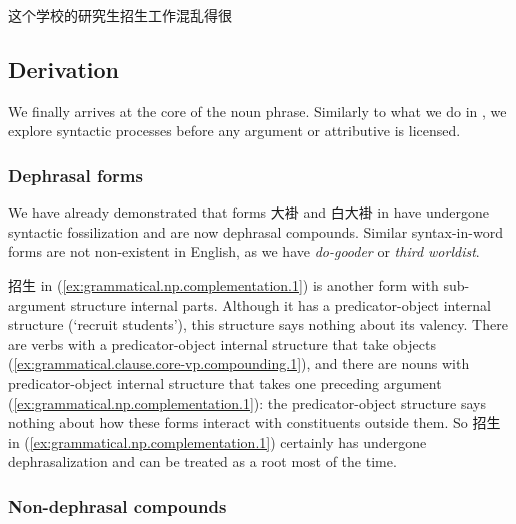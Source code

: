 \documentclass[UTF8, a4paper, oneside, scheme=plain, 12pt]{ctexrep}
\newcommand{\form}[1]{\emph{#1}}
\newcommand{\translate}[1]{`#1'}
\begin{document}
\begin{exe}
    \ex\label{ex:grammatical.np.complementation.4} 这个学校的研究生招生工作混乱得很
\end{exe}

\subsection{Derivation}\label{sec:grammatical.np.derivation}

We finally arrives at the core of the noun phrase.
Similarly to what we do in ,
we explore syntactic processes before any argument or attributive is licensed.

\subsubsection{Dephrasal forms}

We have already demonstrated that forms 大褂 and 白大褂 in 
have undergone syntactic fossilization and are now dephrasal compounds.
Similar syntax-in-word forms are not non-existent in English,
as we have \form{do-gooder} or \form{third worldist}.

招生 in (\ref{ex:grammatical.np.complementation.1}) is another form with sub-argument structure internal parts.
Although it has a predicator-object internal structure (\translate{recruit students}),
this structure says nothing about its valency.
There are verbs with a predicator-object internal structure
that take objects (\ref{ex:grammatical.clause.core-vp.compounding.1}),
and there are nouns with predicator-object internal structure 
that takes one preceding argument (\ref{ex:grammatical.np.complementation.1}):
the predicator-object structure says nothing about how these forms
interact with constituents outside them.
So 招生 in (\ref{ex:grammatical.np.complementation.1})
certainly has undergone dephrasalization and
can be treated as a root most of the time.

\subsubsection{Non-dephrasal compounds}\label{sec:grammatical.np.derivation.compounding}
\end{document}
